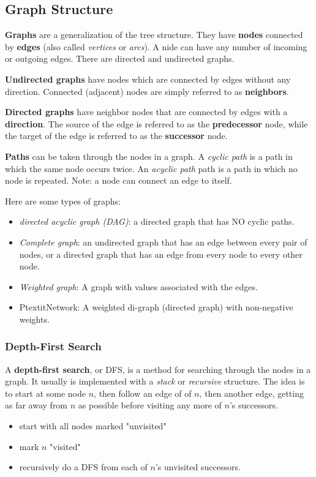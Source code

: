 \subsection{Graph Structure}

\textbf{Graphs} are a generalization of the tree structure. They have \textbf{nodes} connected by \textbf{edges} (also called \textit{vertices} or \textit{arcs}). A nide can have any number of incoming or outgoing edges. There are directed and undirected graphs.

\textbf{Undirected graphs} have nodes which are connected by edges without any direction. Connected (adjacent) nodes are simply referred to as \textbf{neighbors}. 

\textbf{Directed graphs} have neighbor nodes that are connected by edges with a \textbf{direction}. The source of the edge is referred to as the \textbf{predecessor} node, while the target of the edge is referred to as the \textbf{successor} node. 

\textbf{Paths} can be taken through the nodes in a graph. A \textit{cyclic path} is a path in which the same node occurs twice. An \textit{acyclic path} path is a path in which no node is repeated. Note: a node can connect an edge to itself. 

Here are some types of graphs:
\begin{itemize}
	\item \textit{directed acyclic graph (DAG)}: a directed graph that has NO cyclic paths. 
	\item \textit{Complete graph}: an undirected graph that has an edge between every pair of nodes, or a directed graph that has an edge from every node to every other node. 
	\item \textit{Weighted graph}: A graph with values associated with the edges. 
	\item Ptextit{Network}: A weighted di-graph (directed graph) with non-negative weights. 
\end{itemize}

\subsubsection{Depth-First Search}

A \textbf{depth-first search}, or DFS, is a method for searching through the nodes in a graph. It usually is implemented with a \textit{stack} or \textit{recursive} structure. The idea is to start at some node $n$, then follow an edge of of $n$, then another edge, getting as far away from $n$ as possible before visiting any more of $n$'s successors. 
\begin{itemize}
	\item start with all nodes marked "unvisited"
	\item mark $n$ "visited"
	\item recursively do a DFS from each of $n$'s unvisited successors. 
\end{itemize}

